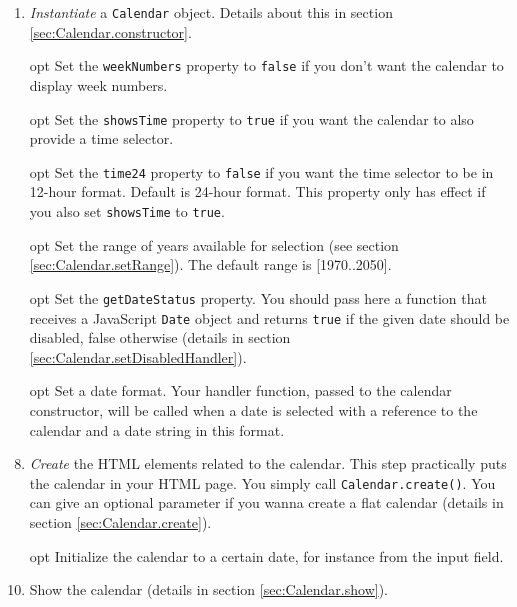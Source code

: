 \documentclass[a4paper,10pt]{article}
\begin{document}
\begin{enumerate}

\item \emph{Instantiate} a \texttt{Calendar} object.  Details about this in
section \ref{sec:Calendar.constructor}.

\item [opt] Set the \texttt{weekNumbers} property to \texttt{false} if you don't want
the calendar to display week numbers.

\item [opt] Set the \texttt{showsTime} property to \texttt{true} if you
want the calendar to also provide a time selector.

\item [opt] Set the \texttt{time24} property to \texttt{false} if you want
the time selector to be in 12-hour format.  Default is 24-hour format.  This
property only has effect if you also set \texttt{showsTime} to
\texttt{true}.

\item [opt] Set the range of years available for selection (see section
\ref{sec:Calendar.setRange}).  The default range is [1970..2050].

\item [opt] Set the \texttt{getDateStatus} property.  You should pass
here a function that receives a JavaScript \texttt{Date} object and returns
\texttt{true} if the given date should be disabled, false otherwise (details in
section \ref{sec:Calendar.setDisabledHandler}).

\item [opt] Set a date format.  Your handler function, passed to the
calendar constructor, will be called when a date is selected with a reference
to the calendar and a date string in this format.

\item \emph{Create} the HTML elements related to the calendar.  This step
practically puts the calendar in your HTML page.  You simply call
\texttt{Calendar.create()}.  You can give an optional parameter if you wanna
create a flat calendar (details in section \ref{sec:Calendar.create}).

\item [opt] Initialize the calendar to a certain date, for instance from
the input field.

\item Show the calendar (details in section \ref{sec:Calendar.show}).

\end{enumerate}
\end{document}

